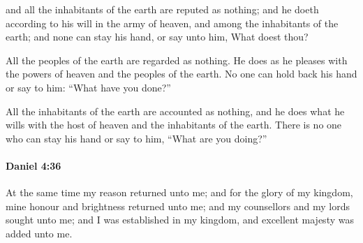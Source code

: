 			\begin{versebox}
					\item[BHS] 
					\item[ASV] and all the inhabitants of the earth are reputed as nothing; and he doeth according to his will in the army of heaven, and among the inhabitants of the earth; and none can stay his hand, or say unto him, What doest thou?
					\item[NIV] All the peoples of the earth are regarded as nothing. He does as he pleases with the powers of heaven and the peoples of the earth. No one can hold back his hand or say to him: “What have you done?”
					\item[NRSV] All the inhabitants of the earth are accounted as nothing, and he does what he wills with the host of heaven and the inhabitants of the earth. There is no one who can stay his hand or say to him, “What are you doing?”
			\end{versebox}

		\paragraph{Daniel 4:36} %
			\label{DANIEL-4-36}

			At the same time my reason returned unto me; and for the glory of my kingdom, mine honour and brightness returned unto me; and my counsellors and my lords sought unto me; and I was established in my kingdom, and excellent majesty was added unto me.

